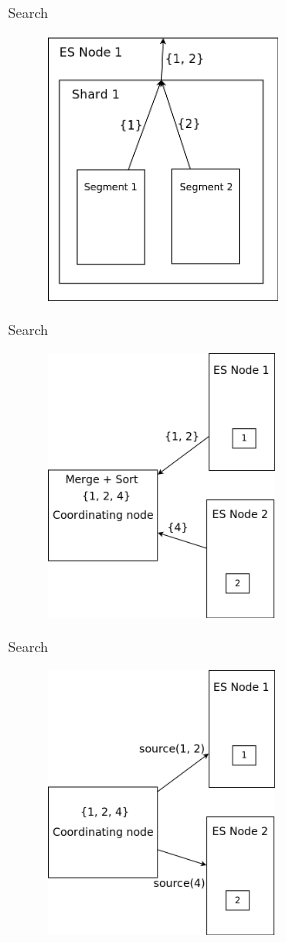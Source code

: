 \documentclass{beamer}
\begin{document}
\begin{frame}{Search}
	\begin{figure}
		\includegraphics[width=\textwidth,height=7cm,keepaspectratio=true]{search6}
	\end{figure}
\end{frame}
\begin{frame}{Search}
	\begin{figure}
		\includegraphics[width=\textwidth,height=7cm,keepaspectratio=true]{search2}
	\end{figure}
\end{frame}
\begin{frame}{Search}
	\begin{figure}
		\includegraphics[width=\textwidth,height=7cm,keepaspectratio=true]{search3}
	\end{figure}
\end{frame}
\end{document}
